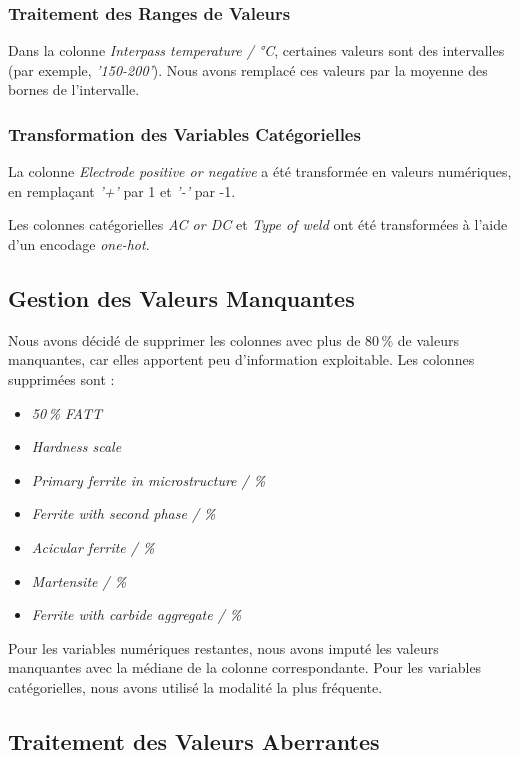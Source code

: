 \documentclass{article}
\begin{document}
\subsubsection{Traitement des Ranges de Valeurs}

Dans la colonne \textit{Interpass temperature / °C}, certaines valeurs sont des intervalles (par exemple, \textit{'150-200'}). Nous avons remplacé ces valeurs par la moyenne des bornes de l'intervalle.

\subsubsection{Transformation des Variables Catégorielles}

La colonne \textit{Electrode positive or negative} a été transformée en valeurs numériques, en remplaçant \textit{'+'} par 1 et \textit{'-'} par -1.

Les colonnes catégorielles \textit{AC or DC} et \textit{Type of weld} ont été transformées à l'aide d'un encodage \textit{one-hot}.

\subsection{Gestion des Valeurs Manquantes}

Nous avons décidé de supprimer les colonnes avec plus de 80\,\% de valeurs manquantes, car elles apportent peu d'information exploitable. Les colonnes supprimées sont :

\begin{itemize}
    \item \textit{50\,\% FATT}
    \item \textit{Hardness scale}
    \item \textit{Primary ferrite in microstructure / \%}
    \item \textit{Ferrite with second phase / \%}
    \item \textit{Acicular ferrite / \%}
    \item \textit{Martensite / \%}
    \item \textit{Ferrite with carbide aggregate / \%}
\end{itemize}

Pour les variables numériques restantes, nous avons imputé les valeurs manquantes avec la médiane de la colonne correspondante. Pour les variables catégorielles, nous avons utilisé la modalité la plus fréquente.

\subsection{Traitement des Valeurs Aberrantes}
\end{document}
